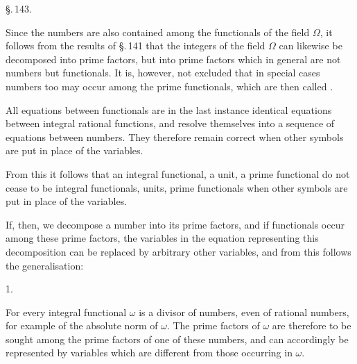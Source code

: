 

\begin{center}
\S.\,143.

\end{center}

Since the numbers are also contained among the functionals of the field $\Omega$, it follows from the results of \S.\,141 that the integers of the field $\Omega$ can likewise be decomposed into prime factors, but into prime factors which in general are not numbers but functionals. It is, however, not excluded that in special cases numbers too may occur among the prime functionals, which are then called .

All equations between functionals are in the last instance identical equations between integral rational functions, and resolve themselves into a sequence of equations between numbers. They therefore remain correct when other symbols are put in place of the variables.

From this it follows that an integral functional, a unit, a prime functional do not cease to be integral functionals, units, prime functionals when other symbols are put in place of the variables.

If, then, we decompose a number into its prime factors, and if functionals occur among these prime factors, the variables in the equation representing this decomposition can be replaced by arbitrary other variables, and from this follows the generalisation:

1. 

For every integral functional $\omega$ is a divisor of numbers, even of rational numbers, for example of the absolute norm of $\omega$. The prime factors of $\omega$ are therefore to be sought among the prime factors of one of these numbers, and can accordingly be represented by variables which are different from those occurring in $\omega$.
